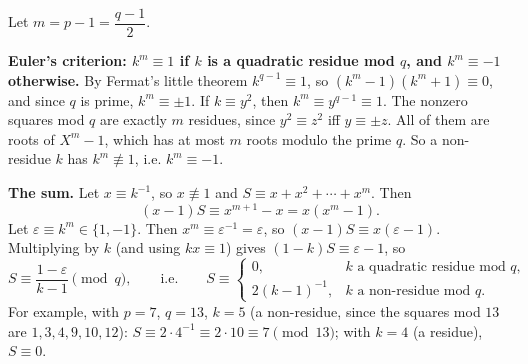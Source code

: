 Let $m=p-1=\dfrac{q-1}{2}$.

\textbf{Euler's criterion: $k^m\equiv1$ if $k$ is a quadratic residue mod $q$, and $k^m\equiv-1$ otherwise.} By Fermat's little theorem $k^{q-1}\equiv1$, so $\left(k^m-1\right)\left(k^m+1\right)\equiv0$, and since $q$ is prime, $k^m\equiv\pm1$. If $k\equiv y^2$, then $k^m\equiv y^{q-1}\equiv1$. The nonzero squares mod $q$ are exactly $m$ residues, since $y^2\equiv z^2$ iff $y\equiv\pm z$. All of them are roots of $X^m-1$, which has at most $m$ roots modulo the prime $q$. So a non-residue $k$ has $k^m\not\equiv1$, i.e. $k^m\equiv-1$.

\textbf{The sum.} Let $x\equiv k^{-1}$, so $x\not\equiv1$ and $S\equiv x+x^2+\cdots+x^m$. Then
\[(x-1)S\equiv x^{m+1}-x=x\left(x^m-1\right).\]
Let $\varepsilon\equiv k^m\in\{1,-1\}$. Then $x^m\equiv\varepsilon^{-1}=\varepsilon$, so $(x-1)S\equiv x(\varepsilon-1)$. Multiplying by $k$ (and using $kx\equiv1$) gives $(1-k)S\equiv\varepsilon-1$, so
\[S\equiv\dfrac{1-\varepsilon}{k-1}\pmod q,\qquad\text{i.e.}\qquad\boxed{S\equiv\begin{cases}0,&k\text{ a quadratic residue mod }q,\\ 2(k-1)^{-1},&k\text{ a non-residue mod }q.\end{cases}}\]
For example, with $p=7$, $q=13$, $k=5$ (a non-residue, since the squares mod $13$ are $1,3,4,9,10,12$): $S\equiv2\cdot4^{-1}\equiv2\cdot10\equiv7\pmod{13}$; with $k=4$ (a residue), $S\equiv0$.
